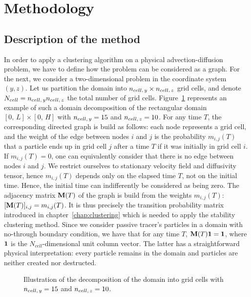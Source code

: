 \section{Methodology}
\subsection{Description of the method}
In order to apply a clustering algorithm on a physical advection-diffusion problem, we have to define how the problem can be considered as a graph. For the next, we consider a two-dimensional problem in the coordinate system $(y,z)$. Let us partition the domain into $n_{cell,\,y} \times n_{cell,\,z}$ grid cells, and denote $N_{cell} = n_{cell,\,y}n_{cell,\,z}$ the total number of grid cells. Figure~\ref{fig:box_scheme} represents an example of such a domain decomposition of the rectangular domain $[0,\,L]\times[0,\,H]$ with $n_{cell,\,y} = 15$ and $n_{cell,\,z} = 10$. For any time $T$, the corresponding directed graph is build as follows: each node represents a grid cell, and the weight of the edge between nodes $i$ and $j$ is the probability $m_{i,j}(T)$ that a particle ends up in grid cell $j$ after a time $T$ if it was initially in grid cell $i$. If $m_{i,j}(T) = 0$, one can equivalently consider that there is no edge between nodes $i$ and $j$. We restrict ourselves to stationary velocity field and diffusivity tensor, hence $m_{i,j}(T)$ depends only on the elapsed time $T$, not on the initial time. Hence, the initial time can indifferently be considered as being zero. The adjacency matrix $\mathbf M(T)$ of the graph is build from the weights $m_{i,j}(T)$: $[\mathbf M(T)]_{i,j} = m_{i,j}(T)$. It is thus precisely the transition probability matrix introduced in chapter~\ref{chap:clustering} which is needed to apply the stability clustering method. Since we consider passive tracer's particles in a domain with no-through boundary condition, we have that for any time $T$, $\mathbf M(T)\mathbf 1 = \mathbf 1$, where $\mathbf 1$ is the $N_{cell}$-dimensional unit column vector. The latter has a straightforward physical interpretation: every particle remains in the domain and particles are neither created nor destructed.

\begin{figure}[!htp]
	\centering
	
	\caption{Illustration of the decomposition of the domain into grid cells with $n_{cell,\,y} = 15$ and $n_{cell,\,z} = 10$.}
	\label{fig:box_scheme}
\end{figure}

